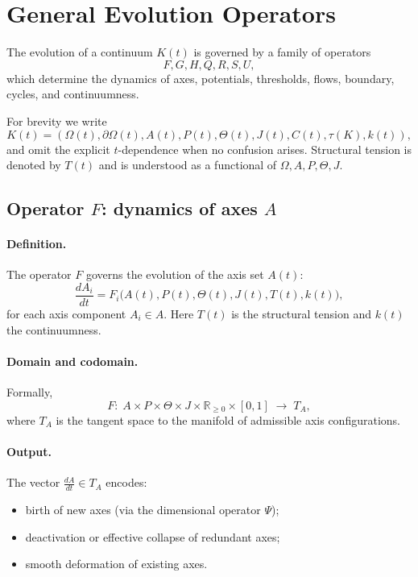 \section{General Evolution Operators}
\label{sec:operators-scoped}

The evolution of a continuum \(K(t)\) is governed by a family of operators
\[
  F,G,H,Q,R,S,U,
\]
which determine the dynamics of axes, potentials, thresholds, flows, boundary, cycles, and continuumness.

For brevity we write
\[
  K(t)=(\Omega(t),\partial\Omega(t),A(t),P(t),\Theta(t),J(t),C(t),\tau(K),k(t)),
\]
and omit the explicit \(t\)-dependence when no confusion arises.
Structural tension is denoted by \(T(t)\) and is understood as a functional of \(\Omega,A,P,\Theta,J\).

\subsection{Operator \texorpdfstring{\(F\)}{F}: dynamics of axes \texorpdfstring{\(A\)}{A}}

\paragraph{Definition.}
The operator \(F\) governs the evolution of the axis set \(A(t)\):
\[
  \frac{dA_i}{dt} = F_i\bigl(A(t),P(t),\Theta(t),J(t),T(t),k(t)\bigr),
\]
for each axis component \(A_i\in A\).
Here \(T(t)\) is the structural tension and \(k(t)\) the continuumness.

\paragraph{Domain and codomain.}
Formally,
\[
  F:\; A\times P\times\Theta\times J\times\mathbb{R}_{\ge 0}\times[0,1]
     \;\longrightarrow\; T_A,
\]
where \(T_A\) is the tangent space to the manifold of admissible axis configurations.

\paragraph{Output.}
The vector \(\frac{dA}{dt}\in T_A\) encodes:
\begin{itemize}
  \item birth of new axes (via the dimensional operator \(\Psi\));
  \item deactivation or effective collapse of redundant axes;
  \item smooth deformation of existing axes.
\end{itemize}

